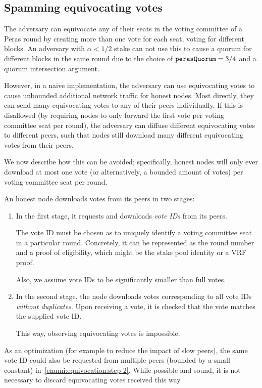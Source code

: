 \subsection{Spamming equivocating votes}\label{sec:attack equivocations}

The adversary can equivocate any of their seats in the voting committee of a Peras round by creating more than one vote for each seat, voting for different blocks.
An adversary with $\alpha<1/2$ stake can not use this to cause a quorum for different blocks in the same round due to the choice of $\mathtt{perasQuorum} = 3/4$ and a quorum intersection argument.

However, in a naive implementation, the adversary can use equivocating votes to cause unbounded additional network traffic for honest nodes.
Most directly, they can send many equivocating votes to any of their peers individually.
If this is disallowed (by requiring nodes to only forward the first vote per voting committee seat per round), the adversary can diffuse different equivocating votes to different peers, such that nodes still download many different equivocating votes from their peers.

We now describe how this can be avoided; specifically, honest nodes will only ever download at most one vote (or alternatively, a bounded amount of votes) per voting committee seat per round.

An honest node downloads votes from its peers in two stages:
\begin{enumerate}
\item\label{enumi:equivocation:step 1}
  In the first stage, it requests and downloads \emph{vote IDs} from its peers.

  The vote ID must be chosen as to uniquely identify a voting committee seat in a particular round.
  Concretely, it can be represented as the round number and a proof of eligibility, which might be the stake pool identity or a VRF proof.

  Also, we assume vote IDs to be significantly smaller than full votes.
\item\label{enumi:equivocation:step 2}
  In the second stage, the node downloads votes corresponding to all vote IDs \emph{without duplicates}.
  Upon receiving a vote, it is checked that the vote matches the supplied vote ID.\@

  This way, observing equivocating votes is impossible.
\end{enumerate}
As an optimization (for example to reduce the impact of slow peers), the same vote ID could also be requested from multiple peers (bounded by a small constant) in~\ref{enumi:equivocation:step 2}.
While possible and sound, it is not necessary to discard equivocating votes received this way.

